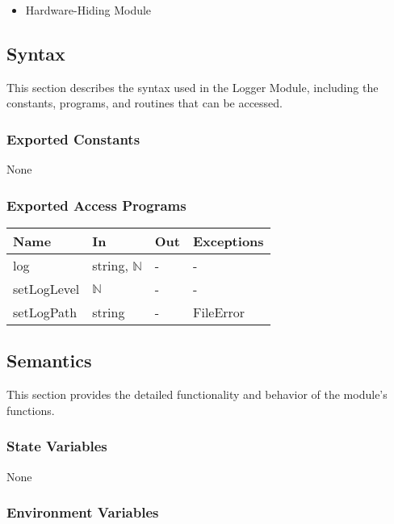\documentclass[12pt, titlepage]{article}
\begin{document}
\begin{itemize}
\item Hardware-Hiding Module
\end{itemize}

\subsection{Syntax}

This section describes the syntax used in the Logger Module, including the
constants, programs, and routines that can be accessed.

\subsubsection{Exported Constants}

None

\subsubsection{Exported Access Programs}

\begin{center}
\begin{tabular}{p{2cm} p{4cm} p{4cm} p{2cm}}
\hline
\textbf{Name} & \textbf{In} & \textbf{Out} & \textbf{Exceptions} \\
\hline
log & string, $\mathbb{N}$ & - & - \\
setLogLevel & $\mathbb{N}$ & - & - \\
setLogPath & string & - & FileError \\
\hline
\end{tabular}
\end{center}

\subsection{Semantics}

This section provides the detailed functionality and behavior of the module’s
functions.

\subsubsection{State Variables}

None

\subsubsection{Environment Variables}
\end{document}
